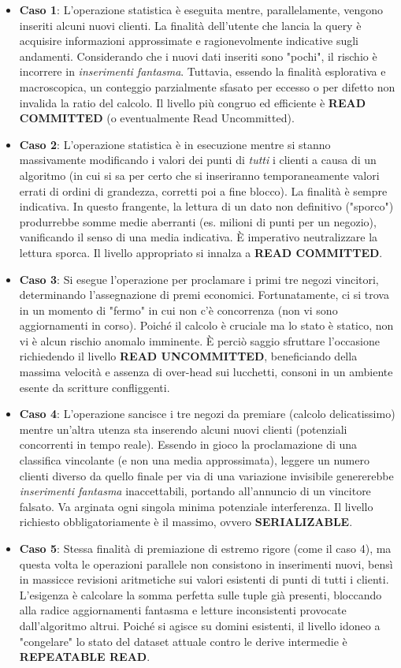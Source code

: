 \begin{itemize}
    \item \textbf{Caso 1}: L'operazione statistica è eseguita mentre, parallelamente, vengono inseriti alcuni nuovi clienti. La finalità dell'utente che lancia la query è acquisire informazioni approssimate e ragionevolmente indicative sugli andamenti. Considerando che i nuovi dati inseriti sono "pochi", il rischio è incorrere in \textit{inserimenti fantasma}. Tuttavia, essendo la finalità esplorativa e macroscopica, un conteggio parzialmente sfasato per eccesso o per difetto non invalida la ratio del calcolo. Il livello più congruo ed efficiente è \textbf{READ COMMITTED} (o eventualmente Read Uncommitted).
    \item \textbf{Caso 2}: L'operazione statistica è in esecuzione mentre si stanno massivamente modificando i valori dei punti di \textit{tutti} i clienti a causa di un algoritmo (in cui si sa per certo che si inseriranno temporaneamente valori errati di ordini di grandezza, corretti poi a fine blocco). La finalità è sempre indicativa. In questo frangente, la lettura di un dato non definitivo ("sporco") produrrebbe somme medie aberranti (es. milioni di punti per un negozio), vanificando il senso di una media indicativa. È imperativo neutralizzare la lettura sporca. Il livello appropriato si innalza a \textbf{READ COMMITTED}.
    \item \textbf{Caso 3}: Si esegue l'operazione per proclamare i primi tre negozi vincitori, determinando l'assegnazione di premi economici. Fortunatamente, ci si trova in un momento di "fermo" in cui non c'è concorrenza (non vi sono aggiornamenti in corso). Poiché il calcolo è cruciale ma lo stato è statico, non vi è alcun rischio anomalo imminente. È perciò saggio sfruttare l'occasione richiedendo il livello \textbf{READ UNCOMMITTED}, beneficiando della massima velocità e assenza di over-head sui lucchetti, consoni in un ambiente esente da scritture confliggenti.
    \item \textbf{Caso 4}: L'operazione sancisce i tre negozi da premiare (calcolo delicatissimo) mentre un'altra utenza sta inserendo alcuni nuovi clienti (potenziali concorrenti in tempo reale). Essendo in gioco la proclamazione di una classifica vincolante (e non una media approssimata), leggere un numero clienti diverso da quello finale per via di una variazione invisibile genererebbe \textit{inserimenti fantasma} inaccettabili, portando all'annuncio di un vincitore falsato. Va arginata ogni singola minima potenziale interferenza. Il livello richiesto obbligatoriamente è il massimo, ovvero \textbf{SERIALIZABLE}.
    \item \textbf{Caso 5}: Stessa finalità di premiazione di estremo rigore (come il caso 4), ma questa volta le operazioni parallele non consistono in inserimenti nuovi, bensì in massicce revisioni aritmetiche sui valori esistenti di punti di tutti i clienti. L'esigenza è calcolare la somma perfetta sulle tuple già presenti, bloccando alla radice aggiornamenti fantasma e letture inconsistenti provocate dall'algoritmo altrui. Poiché si agisce su domini esistenti, il livello idoneo a "congelare" lo stato del dataset attuale contro le derive intermedie è \textbf{REPEATABLE READ}.
\end{itemize}


